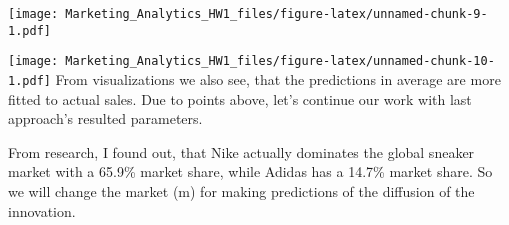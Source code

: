 \documentclass[
]{article}
\newenvironment{Shaded}{\begin{snugshade}}{\end{snugshade}}
\newcommand{\AttributeTok}[1]{\textcolor[rgb]{0.13,0.29,0.53}{#1}}
\newcommand{\DecValTok}[1]{\textcolor[rgb]{0.00,0.00,0.81}{#1}}
\newcommand{\FunctionTok}[1]{\textcolor[rgb]{0.13,0.29,0.53}{\textbf{#1}}}
\newcommand{\NormalTok}[1]{#1}
\newcommand{\OtherTok}[1]{\textcolor[rgb]{0.56,0.35,0.01}{#1}}
\newcommand{\SpecialCharTok}[1]{\textcolor[rgb]{0.81,0.36,0.00}{\textbf{#1}}}
\newcommand{\StringTok}[1]{\textcolor[rgb]{0.31,0.60,0.02}{#1}}
\begin{document}
\texttt{[image: Marketing\_Analytics\_HW1\_files/figure-latex/unnamed-chunk-9-1.pdf]}

\begin{Shaded}
\end{Shaded}

\texttt{[image: Marketing\_Analytics\_HW1\_files/figure-latex/unnamed-chunk-10-1.pdf]}
From visualizations we also see, that the predictions in average are
more fitted to actual sales. Due to points above, let's continue our
work with last approach's resulted parameters.

From research, I found out, that Nike actually dominates the global
sneaker market with a 65.9\% market share, while Adidas has a 14.7\%
market share. So we will change the market (m) for making predictions of
the diffusion of the innovation.
\end{document}
